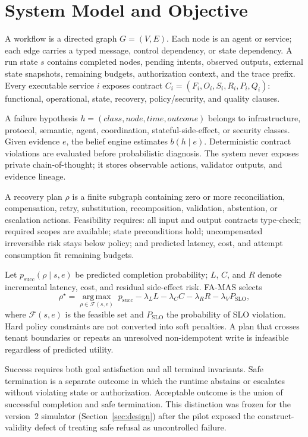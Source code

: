 \documentclass[10pt,journal,compsoc]{IEEEtran}
\newcommand{\famas}{FA-MAS}
\begin{document}
\section{System Model and Objective}\label{sec:model}
A workflow is a directed graph $G=(V,E)$. Each node is an agent or service; each edge carries a typed message, control dependency, or state dependency. A run state $s$ contains completed nodes, pending intents, observed outputs, external state snapshots, remaining budgets, authorization context, and the trace prefix. Every executable service $i$ exposes contract $C_i=(F_i,O_i,S_i,R_i,P_i,Q_i)$: functional, operational, state, recovery, policy/security, and quality clauses.

A failure hypothesis $h=(\mathit{class},\mathit{node},\mathit{time},\mathit{outcome})$ belongs to infrastructure, protocol, semantic, agent, coordination, stateful-side-effect, or security classes. Given evidence $e$, the belief engine estimates $b(h\mid e)$. Deterministic contract violations are evaluated before probabilistic diagnosis. The system never exposes private chain-of-thought; it stores observable actions, validator outputs, and evidence lineage.

A recovery plan $\rho$ is a finite subgraph containing zero or more reconciliation, compensation, retry, substitution, recomposition, validation, abstention, or escalation actions. Feasibility requires: all input and output contracts type-check; required scopes are available; state preconditions hold; uncompensated irreversible risk stays below policy; and predicted latency, cost, and attempt consumption fit remaining budgets.

Let $p_{\mathrm{succ}}(\rho\mid s,e)$ be predicted completion probability; $L$, $C$, and $R$ denote incremental latency, cost, and residual side-effect risk. \famas{} selects
\begin{equation}
\rho^{\star}=\operatorname*{arg\,max}_{\rho\in\mathcal{F}(s,e)}\; p_{\mathrm{succ}}-\lambda_L L-\lambda_C C-\lambda_R R-\lambda_V P_{\mathrm{SLO}},
\end{equation}
where $\mathcal{F}(s,e)$ is the feasible set and $P_{\mathrm{SLO}}$ the probability of SLO violation. Hard policy constraints are not converted into soft penalties. A plan that crosses tenant boundaries or repeats an unresolved non-idempotent write is infeasible regardless of predicted utility.

Success requires both goal satisfaction and all terminal invariants. Safe termination is a separate outcome in which the runtime abstains or escalates without violating state or authorization. Acceptable outcome is the union of successful completion and safe termination. This distinction was frozen for the version~2 simulator (Section~\ref{sec:design}) after the pilot exposed the construct-validity defect of treating safe refusal as uncontrolled failure.
\end{document}
